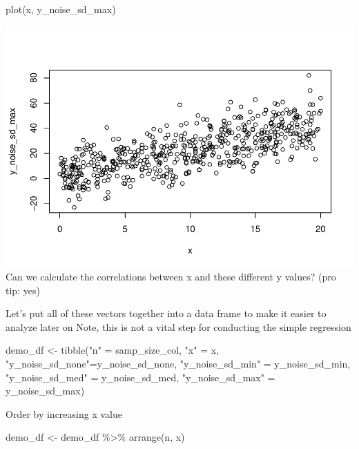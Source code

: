 \documentclass[
]{book}
\newenvironment{Shaded}{\begin{snugshade}}{\end{snugshade}}
\newcommand{\FunctionTok}[1]{\textcolor[rgb]{0.00,0.00,0.00}{#1}}
\newcommand{\NormalTok}[1]{#1}
\newcommand{\OtherTok}[1]{\textcolor[rgb]{0.56,0.35,0.01}{#1}}
\newcommand{\SpecialCharTok}[1]{\textcolor[rgb]{0.00,0.00,0.00}{#1}}
\newcommand{\StringTok}[1]{\textcolor[rgb]{0.31,0.60,0.02}{#1}}
\begin{document}
\begin{Shaded}
\begin{Highlighting}[]
\FunctionTok{plot}\NormalTok{(x, y\_noise\_sd\_max)}
\end{Highlighting}
\end{Shaded}

\includegraphics{test_course_notes_files/figure-latex/unnamed-chunk-80-4.pdf}
Can we calculate the correlations between x and these different y values? (pro tip: yes)

Let's put all of these vectors together into a data frame to make it easier to analyze later on
Note, this is not a vital step for conducting the simple regression

\begin{Shaded}
\begin{Highlighting}[]
\NormalTok{demo\_df }\OtherTok{\textless{}{-}} \FunctionTok{tibble}\NormalTok{(}\StringTok{"n"} \OtherTok{=}\NormalTok{ samp\_size\_col,}
                  \StringTok{"x"} \OtherTok{=}\NormalTok{ x, }
                  \StringTok{"y\_noise\_sd\_none"}\OtherTok{=}\NormalTok{y\_noise\_sd\_none, }
                  \StringTok{"y\_noise\_sd\_min"} \OtherTok{=}\NormalTok{ y\_noise\_sd\_min,}
                  \StringTok{"y\_noise\_sd\_med"} \OtherTok{=}\NormalTok{ y\_noise\_sd\_med,}
                  \StringTok{"y\_noise\_sd\_max"} \OtherTok{=}\NormalTok{ y\_noise\_sd\_max)}
\end{Highlighting}
\end{Shaded}

Order by increasing x value

\begin{Shaded}
\begin{Highlighting}[]
\NormalTok{demo\_df }\OtherTok{\textless{}{-}}\NormalTok{ demo\_df }\SpecialCharTok{\%\textgreater{}\%} 
  \FunctionTok{arrange}\NormalTok{(n, x)}
\end{Highlighting}
\end{Shaded}
\end{document}
